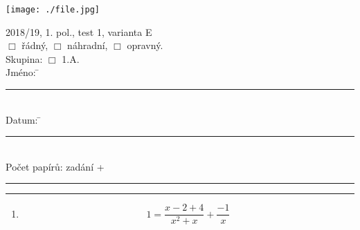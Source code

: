 \documentclass[czech, a4paper, 12pt]{exam}
\begin{document}
\begin{minipage}{9cm}
    \texttt{[image: ./file.jpg]}
\end{minipage}
\begin{minipage}{5cm}
\begin{tabbing}
2018/19, 1. pol., test 1, varianta E\\[.1cm]
$\Box$ řádný, \hspace{.2cm} $\Box$ náhradní, \hspace{.2cm} $\Box$ opravný. \\[.1cm]
Skupina:
    $\Box$ 1.A. \\[.1cm]
Jméno: \hspace{2cm} \= \rule{4.7cm}{.1mm} \\[.1cm]
Datum: \hspace{2cm} \= \rule{4.7cm}{.1mm} \\[.1cm]
Počet papírů:\> zadání + \rule{1.2cm}{.1mm}
\end{tabbing}
\end{minipage}

\vspace{.3cm}
\begin{center}
\rule{17cm}{.7mm}
\end{center}
\vspace{.3cm}



\begin{enumerate}


    \item
    $$ 1 = \frac{x - 2 + 4}{x^2 + x} + \frac{ -1 }{x} $$




\end{enumerate}
\end{document}
